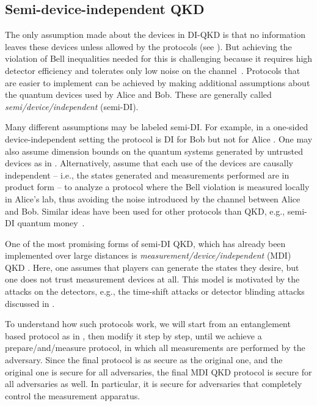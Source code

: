 \subsection{Semi-device-independent QKD}
\label{sec:alternative.semi}

The only assumption made about the devices in DI-QKD is that no
information leaves these devices unless allowed by the protocols (see
). But achieving the violation of Bell
inequalities needed for this is challenging because it requires high
detector efficiency and tolerates only low noise on the
channel~\cite{BCPSW14}. Protocols that are easier to implement can be
achieved by making additional assumptions about the quantum devices
used by Alice and Bob. These are generally called
\emph{semi\-/device\-/independent} (semi-DI).

Many different assumptions may be labeled semi-DI. For example, in a
one-sided device-independent setting the protocol is DI for Bob but
not for Alice \cite{BCWSW12}. One may also assume dimension bounds on
the quantum systems generated by untrusted devices as in
\textcite{PB11}. Alternatively, \textcite{LPTRG13} assume that each
use of the devices are causally independent \--- i.e., the states
generated and measurements performed are in product form \--- to
analyze a protocol where the Bell violation is measured locally in
Alice's lab, thus avoiding the noise introduced by the channel between
Alice and Bob. Similar ideas have been used for other protocols than
QKD, e.g., semi-DI quantum money~\cite{HS20,BDG19}.

One of the most promising forms of semi-DI QKD, which has already been
implemented over large distances
\cite{Liu13,Tang2014,Pirandola2015,Yin2016} is
\emph{measurement\-/device\-/independent} (MDI) QKD
\cite{LCQ12,BP12,MR12,CXCLTL14}. Here, one assumes that players can
generate the states they desire, but one does not trust measurement
devices at all. This model is motivated by the attacks on the
detectors, e.g., the time-shift attacks or detector blinding attacks
discussed in .

To understand how such protocols work, we will start from an
entanglement based protocol as in
, then modify it step by
step, until we achieve a prepare\-/and\-/measure protocol, in which
all measurements are performed by the adversary. Since the final
protocol is as secure as the original one, and the original one is
secure for all adversaries, the final MDI QKD protocol is secure
for all adversaries as well. In particular, it is secure for
adversaries that completely control the measurement apparatus.

